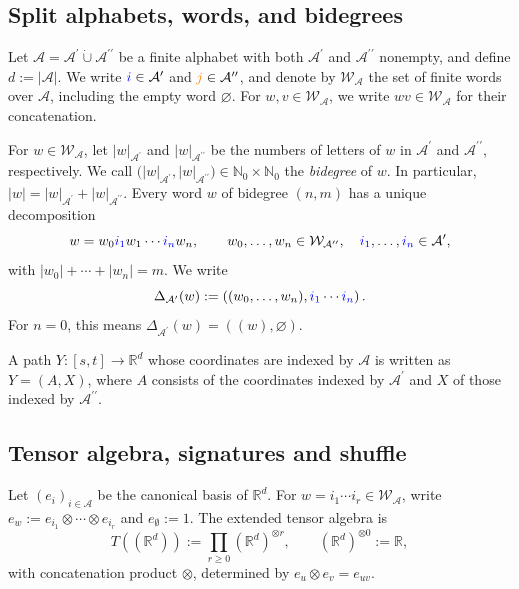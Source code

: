 \documentclass{amsart}
\theoremstyle{definition}
\theoremstyle{remark}
\newcommand{\decomp}[1]{\Delta_{#1}}
\newcommand{\blue}[1]{{\color{blue}#1}}
\newcommand{\orange}[1]{{\color{orange}#1}}
\begin{document}
\subsection{Split alphabets, words, and bidegrees}\label{sec:split_alphabet}

Let
$\mathcal{A}
=
\mathcal{A}^{\prime}
\mathbin{\dot\cup}
\mathcal{A}^{\prime\prime}$
be a finite alphabet with both $\mathcal{A}^{\prime}$ and
$\mathcal{A}^{\prime\prime}$ nonempty, and define
$d := |\mathcal{A}|$. We write
$\blue{i}\in\mathcal{A}^{\prime}$ and
$\orange{j}\in\mathcal{A}^{\prime\prime}$, and denote by
$\mathcal{W}_{\mathcal{A}}$ the set of finite words over $\mathcal{A}$,
including the empty word $\varnothing$. For
$w,v \in \mathcal{W}_{\mathcal{A}}$, we write
$wv \in \mathcal{W}_{\mathcal{A}}$ for their concatenation.

For $w\in\mathcal{W}_{\mathcal{A}}$, let
$|w|_{\mathcal{A}^{\prime}}$ and
$|w|_{\mathcal{A}^{\prime\prime}}$ be the numbers of letters of $w$ in
$\mathcal{A}^{\prime}$ and $\mathcal{A}^{\prime\prime}$, respectively. We
call
$\bigl(
|w|_{\mathcal{A}^{\prime}},
|w|_{\mathcal{A}^{\prime\prime}}
\bigr) \in \mathbb{N}_0\times\mathbb{N}_0$
the \emph{bidegree} of $w$. In particular,
$|w|
=
|w|_{\mathcal{A}^{\prime}}
+
|w|_{\mathcal{A}^{\prime\prime}}$.
Every word $w$ of bidegree $(n,m)$ has a unique decomposition
\[
    w
    =
    w_0\blue{i_1}w_1\cdots\blue{i_n}w_n,
    \qquad
    w_0,\ldots,w_n
    \in
    \mathcal{W}_{\mathcal{A}^{\prime\prime}},
    \quad
    \blue{i_1},\ldots,\blue{i_n}
    \in
    \mathcal{A}^{\prime},
\]
with $|w_0|+\cdots+|w_n| = m$.
We write
\[
    \decomp{\mathcal{A}^{\prime}}(w)
    :=
    \left(
        (w_0,\ldots,w_n),
        \blue{i_1}\cdots\blue{i_n}
    \right).
\]
For $n=0$, this means
$\decomp{\mathcal{A}^{\prime}}(w)=((w),\varnothing)$.

A path $Y\colon[s,t]\to\mathbb{R}^{d}$ whose coordinates are indexed by
$\mathcal{A}$ is written as $Y=(A,X)$, where $A$ consists of the coordinates
indexed by $\mathcal{A}^{\prime}$ and $X$ of those indexed by
$\mathcal{A}^{\prime\prime}$.

\subsection{Tensor algebra, signatures and shuffle}
\label{sec:tensor_signatures}

Let $(e_i)_{i\in\mathcal{A}}$ be the canonical basis of
$\mathbb{R}^{d}$. For
$w=i_1\cdots i_r\in\mathcal{W}_{\mathcal{A}}$, write
$e_w:=e_{i_1}\otimes\cdots\otimes e_{i_r}$ and
$e_{\emptyset}:=1$. The extended tensor algebra is
\[
    T((\mathbb{R}^{d}))
    :=
    \prod_{r\geq0}
    (\mathbb{R}^{d})^{\otimes r},
    \qquad
    (\mathbb{R}^{d})^{\otimes0}
    :=
    \mathbb{R},
\]
with concatenation product $\otimes$, determined by
$e_u\otimes e_v=e_{uv}$.
\end{document}
